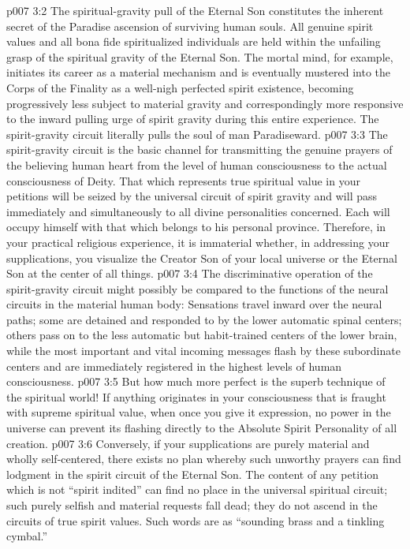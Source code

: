 \vs p007 3:2 The spiritual\hyp{}gravity pull of the Eternal Son constitutes the inherent secret of the Paradise ascension of surviving human souls. All genuine spirit values and all bona fide spiritualized individuals are held within the unfailing grasp of the spiritual gravity of the Eternal Son. The mortal mind, for example, initiates its career as a material mechanism and is eventually mustered into the Corps of the Finality as a well\hyp{}nigh perfected spirit existence, becoming progressively less subject to material gravity and correspondingly more responsive to the inward pulling urge of spirit gravity during this entire experience. The spirit\hyp{}gravity circuit literally pulls the soul of man Paradiseward.
\pc \vs p007 3:3 The spirit\hyp{}gravity circuit is the basic channel for transmitting the genuine prayers of the believing human heart from the level of human consciousness to the actual consciousness of Deity. That which represents true spiritual value in your petitions will be seized by the universal circuit of spirit gravity and will pass immediately and simultaneously to all divine personalities concerned. Each will occupy himself with that which belongs to his personal province. Therefore, in your practical religious experience, it is immaterial whether, in addressing your supplications, you visualize the Creator Son of your local universe or the Eternal Son at the center of all things.
\pc \vs p007 3:4 The discriminative operation of the spirit\hyp{}gravity circuit might possibly be compared to the functions of the neural circuits in the material human body: Sensations travel inward over the neural paths; some are detained and responded to by the lower automatic spinal centers; others pass on to the less automatic but habit\hyp{}trained centers of the lower brain, while the most important and vital incoming messages flash by these subordinate centers and are immediately registered in the highest levels of human consciousness.
\vs p007 3:5 But how much more perfect is the superb technique of the spiritual world! If anything originates in your consciousness that is fraught with supreme spiritual value, when once you give it expression, no power in the universe can prevent its flashing directly to the Absolute Spirit Personality of all creation.
\vs p007 3:6 Conversely, if your supplications are purely material and wholly self\hyp{}centered, there exists no plan whereby such unworthy prayers can find lodgment in the spirit circuit of the Eternal Son. The content of any petition which is not “spirit indited” can find no place in the universal spiritual circuit; such purely selfish and material requests fall dead; they do not ascend in the circuits of true spirit values. Such words are as “sounding brass and a tinkling cymbal.”
